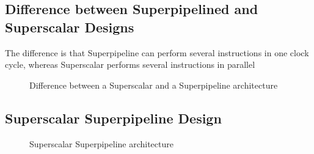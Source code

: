 \subsection{Difference between Superpipelined and Superscalar Designs}
The difference is that Superpipeline can perform several instructions in one clock cycle, whereas Superscalar performs several instructions in parallel

\begin{figure}[H]
  \centering
  \caption{Difference between a Superscalar and a Superpipeline architecture}
  \label{fig:superscalar-vs-superpipeline}
\end{figure}


\subsection{Superscalar Superpipeline Design}

\begin{figure}[H]
  \centering
  \caption{Superscalar Superpipeline architecture}
  \label{fig:superscalar-superpipeline}
\end{figure}

